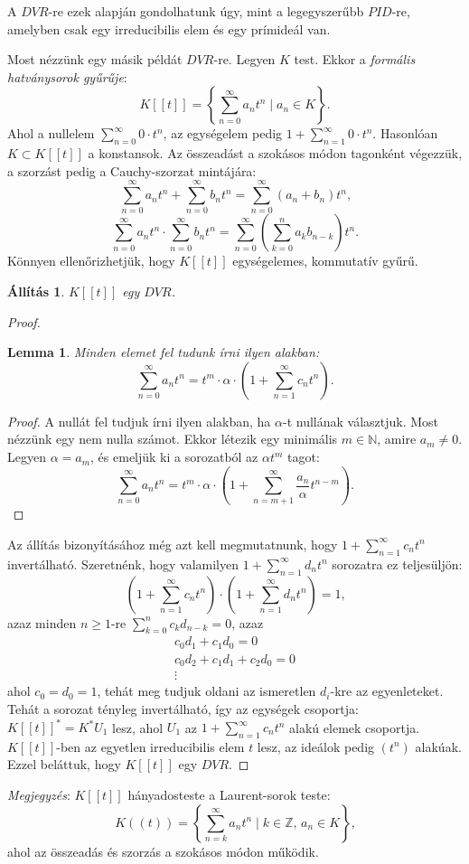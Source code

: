 \documentclass[12pt, notitlepage]{article}
\newtheorem*{lemma}{Lemma}
\newtheorem*{allitas}{Állítás}
\begin{document}
A $DVR$-re ezek alapján gondolhatunk úgy, mint a legegyszerűbb $PID$-re, amelyben csak egy irreducibilis elem és egy prímideál van.

Most nézzünk egy másik példát $DVR$-re. Legyen $K$ test. Ekkor a \textit{formális hatványsorok gyűrűje}:
\[K[[t]] = \left\{ \sum_{n=0}^{\infty} a_nt^n \mid a_n \in K\right\}\text{.}\]
Ahol a nullelem $\sum_{n=0}^{\infty} 0\cdot t^n$, az egységelem pedig $1+\sum_{n=1}^{\infty} 0 \cdot t^n$. Hasonlóan $K \subset K[[t]]$ a konstansok. Az összeadást a szokásos módon tagonként végezzük, a szorzást pedig a Cauchy-szorzat mintájára:
\[\sum_{n=0}^{\infty} a_nt^n + \sum_{n=0}^{\infty} b_nt^n = \sum_{n=0}^{\infty} (a_n+b_n)t^n \text{,}\]
\[\sum_{n=0}^{\infty} a_nt^n \cdot \sum_{n=0}^{\infty} b_nt^n = \sum_{n=0}^{\infty}\left( \sum_{k=0}^{n} a_kb_{n-k}\right)t^n \text{.}\]
Könnyen ellenőrizhetjük, hogy $K[[t]]$ egységelemes, kommutatív gyűrű.

\begin{allitas}
    $K[[t]]$ egy $DVR$.
\end{allitas}
\begin{proof}
    \begin{lemma}
        Minden elemet fel tudunk írni ilyen alakban:
        \[ \sum_{n=0}^{\infty} a_nt^n = t^m \cdot \alpha \cdot \left(1 + \sum_{n=1}^{\infty} c_nt^n \right) \text{.}\]
    \end{lemma}
    \begin{proof}
        A nullát fel tudjuk írni ilyen alakban, ha $\alpha$-t nullának választjuk. Most nézzünk egy nem nulla számot. Ekkor létezik egy minimális $m \in \mathbb{N}$, amire $a_m \neq 0$. Legyen $\alpha = a_m$, és emeljük ki a sorozatból az $\alpha t^m$ tagot:
        \[\sum_{n=0}^{\infty} a_nt^n = t^m \cdot \alpha \cdot \left(1 + \sum_{n=m+1}^{\infty} \frac{a_n}{\alpha}t^{n-m} \right) \text{.}\]
    \end{proof}
    Az állítás bizonyításához még azt kell megmutatnunk, hogy $1 + \sum_{n=1}^{\infty} c_nt^n$ invertálható. Szeretnénk, hogy valamilyen $1 + \sum_{n=1}^{\infty} d_nt^n$ sorozatra ez teljesüljön:
    \[\left(1 + \sum_{n=1}^{\infty} c_nt^n \right) \cdot \left(1 + \sum_{n=1}^{\infty} d_nt^n \right) = 1 \text{,}\]
    azaz minden $n \geq 1$-re $\sum_{k=0}^{n} c_kd_{n-k} = 0$, azaz
    \begin{gather*}
        c_0d_1 + c_1d_0 = 0 \\
        c_0d_2 + c_1d_1 + c_2d_0 = 0 \\
        \vdots
    \end{gather*}
    ahol $c_0 = d_0 = 1$, tehát meg tudjuk oldani az ismeretlen $d_i$-kre az egyenleteket. Tehát a sorozat tényleg invertálható, így az egységek csoportja: $K[[t]]^* = K^*U_1$ lesz, ahol $U_1$ az $1 + \sum_{n=1}^{\infty} c_nt^n$ alakú elemek csoportja. $K[[t]]$-ben az egyetlen irreducibilis elem $t$ lesz, az ideálok pedig $(t^n)$ alakúak. Ezzel beláttuk, hogy $K[[t]]$ egy $DVR$.
\end{proof}

\noindent \textit{Megjegyzés}: $K[[t]]$ hányadosteste a Laurent-sorok teste:
\[K((t)) = \left\{\sum_{n=k}^{\infty} a_nt^n \mid k \in \mathbb{Z} \text{, } a_n \in K \right\}\text{,}\]
ahol az összeadás és szorzás a szokásos módon működik.
\end{document}
